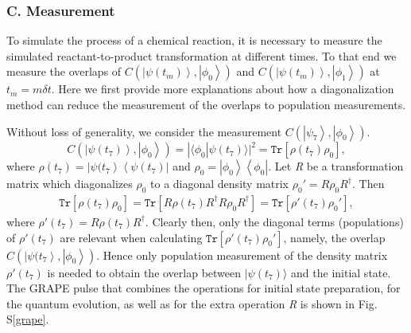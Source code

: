 \documentclass[twocolumn,showpacs,twoside,10pt,prl]{revtex4}
\newcommand{\la}{\langle}
\newcommand{\ra}{\rangle}
\begin{document}
\subsubsection*{\textbf{C. Measurement}}

To simulate the process of a chemical reaction, it is necessary to measure the simulated reactant-to-product transformation at different times. To that end we measure the overlaps of $C(\left\vert \psi({t_m}) \right\rangle,\left\vert \phi_{0} \right\rangle)$ and $C(\left\vert \psi(t_{m}) \right\rangle,\left\vert \phi_{1} \right\rangle)$ at $t_m=m\delta t$.
Here we first provide more explanations about how a diagonalization method can reduce the measurement of the overlaps to population measurements.


Without loss of generality, we consider the measurement $C(\left\vert \psi_{7} \right\rangle,\left\vert \phi_{0} \right\rangle)$.
\begin{equation}\label{overlap7}
C(\left\vert \psi(t_{7}) \right\rangle,\left\vert \phi_{0} \right\rangle)=| \la\phi_0|\psi(t_7)\ra |^2=\texttt{Tr}[\rho(t_7) \rho_0],
\end{equation}
where $\rho(t_7)=\left\vert \psi(t_{7} \right\rangle\left\langle \psi(t_{7}) \right\vert$ and $\rho_0=\left\vert \phi_{0} \right\rangle\left\langle \phi_{0} \right\vert$. Let \emph{R} be a transformation matrix which diagonalizes $\rho_0$ to a diagonal density matrix $\rho_0'=R \rho_0R^{\dagger}$. Then
\begin{eqnarray}\label{diag}
\texttt{Tr}[\rho(t_7) \rho_0]=\texttt{Tr}[R\rho(t_7) R^{\dagger}R \rho_0R^{\dagger}]=\texttt{Tr}[\rho'(t_7) \rho_0'],
\end{eqnarray}
where $\rho'(t_7)=R \rho(t_7)R^{\dagger}$.
Clearly then, only the diagonal terms (populations) of $\rho'(t_7)$ are relevant when calculating $\texttt{Tr}[\rho'(t_7) \rho_0']$,
namely, the overlap $C(\left\vert \psi(t_{7} \right\rangle,\left\vert \phi_{0} \right\rangle)$. Hence only population measurement of the  density matrix $\rho'(t_7)$ is needed to obtain the overlap between $|\psi(t_7)\rangle$ and the initial state.
The GRAPE pulse that combines the operations for initial state preparation, for the quantum evolution, as well as for the extra operation \emph{R} is shown in Fig. S\ref{grape}.
\end{document}
